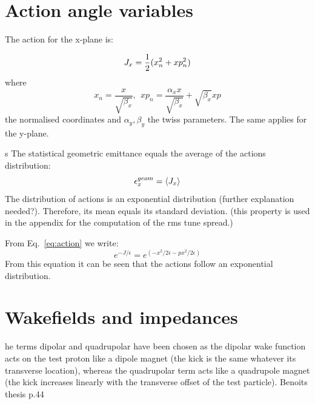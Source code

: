 {{%
\section{Action angle variables}
The action for the x-plane is:

\begin{equation}\label{eq:action}
    {J_x} = \frac{1}{2}(x_n^2 +xp^2_n) 
\end{equation}
where 
\begin{equation}\label{normalised_y}
    x_n = \frac{x}{\sqrt{\beta_x}}, \ \ xp_n = \frac{\alpha_x x}{\sqrt{\beta_x}} + \sqrt{\beta_x}xp
\end{equation}
the normalised coordinates and $\alpha_y, \beta_y$ the twiss parameters. 
The same applies for the y-plane. 

s
The statistical geometric emittance equals the average of the actions distribution:
\begin{equation}\label{eq:geom_emit_actions}
    {\epsilon_x^{geom}} = \langle {J_x} \rangle
\end{equation}
The distribution of actions is an exponential distribution (further explanation needed?). Therefore, its mean equals its standard deviation. (this property is used in the appendix for the computation of the rms tune spread.)

From Eq.~\eqref{eq:action} we write:
\begin{equation}\label{eq:Jy_exp_distr}
    e^{-J/\epsilon} = e^{(-x^2/2\epsilon - px^2/2\epsilon)}
\end{equation}
From this equation it can be seen that the actions follow an exponential distribution. 

\section{Wakefields and impedances}\label{sec:wakefields_theory}

he terms dipolar and quadrupolar have been chosen as the dipolar wake function acts on the test proton like a dipole magnet (the kick is the same whatever its transverse location), whereas the quadrupolar term acts like a quadrupole magnet (the kick increases linearly with the transverse offset of the test particle). Benoits thesis p.44


}}
